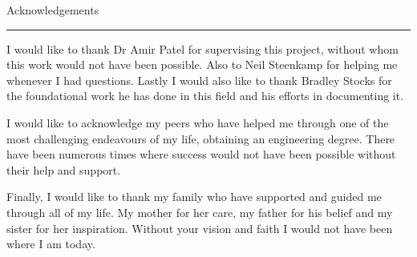 \pagestyle{plain}


{\Large Acknowledgements}
\vskip 5mm
\hrule
\vskip 5mm

I would like to thank Dr Amir Patel for supervising this project, without whom this work would not have been possible. Also to Neil Steenkamp for helping me whenever I had questions. Lastly I would also like to thank Bradley Stocks for the foundational work he has done in this field and his efforts in documenting it. 

I would like to acknowledge my peers who have helped me through one of the most challenging endeavours of my life, obtaining an engineering degree. There have been numerous times where success would not have been possible without their help and support. 

Finally, I would like to thank my family who have supported and guided me through all of my life. My mother for her care, my father for his belief and my sister for her inspiration. Without your vision and faith I would not have been where I am today.

 





